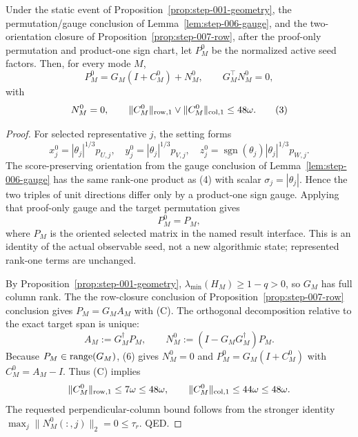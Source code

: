 \begin{lemma}\label{lem:step-008-seed-decomp}
Under the static event of Proposition~\ref{prop:step-001-geometry}, the
permutation/gauge conclusion of Lemma~\ref{lem:step-006-gauge}, and the
two-orientation closure of Proposition~\ref{prop:step-007-row}, after the
proof-only permutation and product-one sign chart, let $P_M^0$ be the
normalized active seed factors. Then, for every mode $M$,
\[
 P_M^0=G_M(I+C_M^0)+N_M^0,\qquad G_M^\top N_M^0=0, \tag{2}
\]
with
\[
 N_M^0=0,\qquad
 \|C_M^0\|_{\rm row,1}\vee\|C_M^0\|_{\rm col,1}\le48\omega. \tag{3}
\]

\begin{proof}

For selected representative $j$, the setting forms
\[
 x_j^0=|\theta_j|^{1/3}p_{U,j},\quad
 y_j^0=|\theta_j|^{1/3}p_{V,j},\quad
 z_j^0=\operatorname{sgn}(\theta_j)|\theta_j|^{1/3}p_{W,j}. \tag{4}
\]
The score-preserving orientation from the gauge conclusion of Lemma~\ref{lem:step-006-gauge} has the same rank-one product
as (4) with scalar $\sigma_j=|\theta_j|$. Hence the two triples of unit
directions differ only by a product-one sign gauge. Applying that proof-only
gauge and the target permutation gives
\[
 P_M^0=P_M, \tag{5}
\]
where $P_M$ is the oriented selected matrix in the named result
interface. This is an identity of the actual observable seed, not a new
algorithmic state; represented rank-one terms are unchanged.

By Proposition~\ref{prop:step-001-geometry}, $\lambda_{\min}(H_M)\ge1-q>0$, so $G_M$ has full column rank. The
the row-closure conclusion of Proposition~\ref{prop:step-007-row} conclusion gives $P_M=G_MA_M$ with (C). The orthogonal
decomposition relative to the exact target span is unique:
\[
 A_M:=G_M^\dagger P_M,\qquad
 N_M^0:=(I-G_MG_M^\dagger)P_M. \tag{6}
\]
Because $P_M\in{\rm range}(G_M)$, (6) gives $N_M^0=0$ and
$P_M^0=G_M(I+C_M^0)$ with $C_M^0=A_M-I$. Thus (C) implies
\[
 \|C_M^0\|_{\rm row,1}\le7\omega\le48\omega,\qquad
 \|C_M^0\|_{\rm col,1}\le44\omega\le48\omega.
\]
The requested perpendicular-column bound follows from the stronger identity
$\max_j\|N_M^0(:,j)\|_2=0\le\tau_r$. QED.


\end{proof}
\end{lemma}
